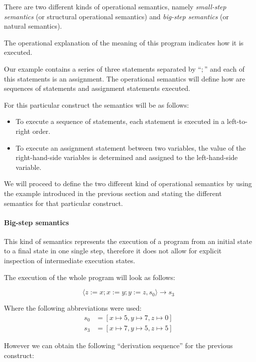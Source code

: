 There are two different kinds of operational semantics, namely \textit{small-step semantics} (or structural operational semantics) and \textit{big-step semantics} (or natural semantics).

The operational explanation of the meaning of this program indicates how it is executed.

Our example contains a series of three statements separated by ``$;$'' and each of this statements is an assignment.
The operational semantics will define how are sequences of statements and assignment statements executed.

For this particular construct the semantics will be as follows:

\begin{itemize}
\item{To execute a sequence of statements, each statement is executed in a left-to-right order.}
\item{To execute an assignment statement between two variables, the value of the right-hand-side variables is determined and assigned to the left-hand-side variable.}
\end{itemize}


We will proceed to define the two different kind of operational semantics by using the example introduced in the previous section and stating the different semantics for that particular construct.

\paragraph{Big-step semantics}

This kind of semantics represents the execution of a program from an initial state to a final state in one single step, therefore it does not allow for explicit inspection of intermediate execution states.~\parencite{nipkow}

The execution of the whole program will look as follows:

\begin{equation*}
\langle z:=x; x:=y; y:=z, s_{0} \rangle \rightarrow s_{3}
\end{equation*}

Where the following abbreviations were used:
\begin{align*}
s_{0} &= [x\mapsto5, y\mapsto7, z\mapsto0]\\
s_{3} &= [x\mapsto7, y\mapsto5, z\mapsto5]
\end{align*}

However we can obtain the following \enquote{derivation sequence} for the previous construct:

